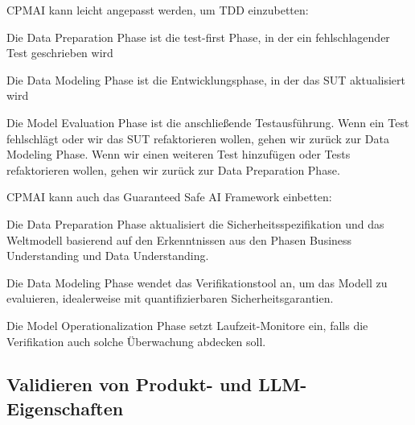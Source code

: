 \documentclass[twocolumn]{article}
\begin{document}
CPMAI kann leicht angepasst werden, um TDD einzubetten:
\begin{compactitem}
\item Die Data Preparation Phase ist die test-first Phase, in der ein fehlschlagender Test geschrieben wird
\item Die Data Modeling Phase ist die Entwicklungsphase, in der das SUT aktualisiert wird
\item Die Model Evaluation Phase ist die anschließende Testausführung. Wenn ein Test fehlschlägt oder wir das SUT refaktorieren wollen, gehen wir zurück zur Data Modeling Phase. Wenn wir einen weiteren Test hinzufügen oder Tests refaktorieren wollen, gehen wir zurück zur Data Preparation Phase.
\end{compactitem}

CPMAI kann auch das Guaranteed Safe AI Framework \cite{Dalrymple24} einbetten:
\begin{compactitem}
\item Die Data Preparation Phase aktualisiert die Sicherheitsspezifikation und das Weltmodell basierend auf den Erkenntnissen aus den Phasen Business Understanding und Data Understanding.
\item Die Data Modeling Phase wendet das Verifikationstool an, um das Modell zu evaluieren, idealerweise mit quantifizierbaren Sicherheitsgarantien.
\item Die Model Operationalization Phase setzt Laufzeit-Monitore ein, falls die Verifikation auch solche Überwachung abdecken soll.
\end{compactitem}

\subsection{Validieren von Produkt- und LLM-Eigenschaften}
\end{document}
